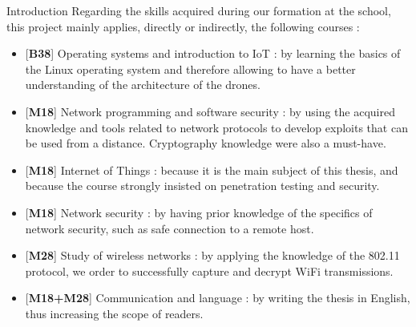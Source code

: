 \begin{chaptercover}{Introduction}
Regarding the skills acquired during our formation at the school, this project mainly applies, directly or indirectly, the following courses :
\begin{itemize}[itemsep=0.1cm,topsep=0.1cm]
  \hyphenation{}
  \item{} [{\color{FirstBlue}\bfseries B38}] Operating systems and introduction to IoT : by learning the basics of the Linux operating system and therefore allowing to have a better understanding of the architecture of the drones.
  \item{} [{\color{FirstBlue}\bfseries M18}] Network programming and software security : by using the acquired knowledge and tools related to network protocols to develop exploits that can be used from a distance. Cryptography knowledge were also a must-have.
  \item{} [{\color{FirstBlue}\bfseries M18}]  Internet of Things : because it is the main subject of this thesis, and because the course strongly insisted on penetration testing and security.
  \item{} [{\color{FirstBlue}\bfseries M18}] Network security : by having prior knowledge of the specifics of network security, such as safe connection to a remote host.
  \item{} [{\color{FirstBlue}\bfseries M28}] Study of wireless networks : by applying the knowledge of the 802.11 protocol, we order to successfully capture and decrypt WiFi transmissions.
  \item{} [{\color{FirstBlue}\bfseries M18+M28}] Communication and language : by writing the thesis in English, thus increasing the scope of readers.
\end{itemize}


\end{chaptercover}
